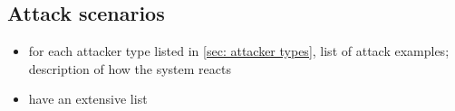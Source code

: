 \subsection{Attack scenarios} \label{sec: attack scenarios}

\begin{itemize}
    \item for each attacker type listed in \cref{sec: attacker types}, list of attack examples; description of how the system reacts
    \item have an extensive list
\end{itemize}
